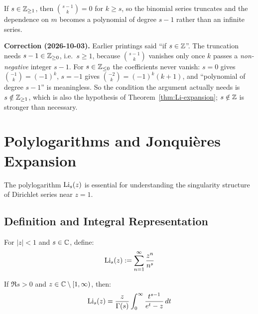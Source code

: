 \begin{remark}\label{rem:integer-s}
If $s \in \mathbb{Z}_{\geq 1}$, then $\binom{s-1}{k} = 0$ for $k \geq s$, so the binomial
series truncates and the dependence on $m$ becomes a polynomial of degree $s-1$
rather than an infinite series.

\textbf{Correction (2026-10-03).} Earlier printings said ``if $s \in \mathbb{Z}$''. The
truncation needs $s-1 \in \mathbb{Z}_{\geq 0}$, i.e.\ $s \geq 1$, because
$\binom{s-1}{k}$ vanishes only once $k$ passes a \emph{non-negative} integer
$s-1$. For $s \in \mathbb{Z}_{\leq 0}$ the coefficients never vanish: $s = 0$ gives
$\binom{-1}{k} = (-1)^k$, $s = -1$ gives $\binom{-2}{k} = (-1)^k(k+1)$, and
``polynomial of degree $s-1$'' is meaningless. So the condition the argument
actually needs is $s \notin \mathbb{Z}_{\geq 1}$, which is also the hypothesis of
Theorem~\ref{thm:Li-expansion}; $s \notin \mathbb{Z}$ is stronger than necessary.
\end{remark}

\section{Polylogarithms and Jonquières Expansion}
\label{sec:polylogarithms}

The polylogarithm $\operatorname{Li}_s(z)$ is essential for understanding the singularity structure of Dirichlet series near $z = 1$.

\subsection{Definition and Integral Representation}

\begin{definition}[Polylogarithm]\label{def:polylog}
For $|z| < 1$ and $s \in \mathbb{C}$, define:
\begin{equation}
\operatorname{Li}_s(z) := \sum_{n=1}^{\infty} \frac{z^n}{n^s}
\end{equation}
\end{definition}

\begin{proposition}\label{prop:polylog-integral}
If $\Re s > 0$ and $z \in \mathbb{C} \setminus [1, \infty)$, then:
\begin{equation}
\operatorname{Li}_s(z) = \frac{z}{\Gamma(s)} \int_0^{\infty} \frac{t^{s-1}}{e^t - z} \, dt
\end{equation}
\end{proposition}

